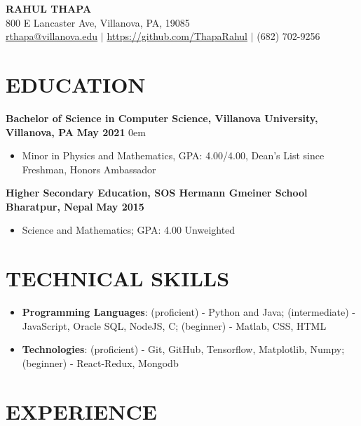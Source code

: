 \documentclass[letterpaper,11pt]{article}
\begin{document}
\begin{center}
    {\LARGE \textbf{RAHUL THAPA}}\\
800 E Lancaster Ave, Villanova, PA, 19085\\
  \href{mailto:rthapa@villanova.edu}{rthapa@villanova.edu} $\vert$ \href{https://github.com/ThapaRahul}{https://github.com/ThapaRahul} $\vert$ (682) 702-9256 \\
\end{center} 



\section{\textbf{EDUCATION}}
      \textbf{Bachelor of Science in Computer Science, Villanova University, Villanova, PA}
      \null\hfill {\textbf{May 2021}}
      \itemsep0em
      \begin{itemize}
      \itemsep0em
          \item \normalfont Minor in Physics and Mathematics, GPA: 4.00/4.00, Dean's List since Freshman, Honors Ambassador
      \end{itemize}
      {\textbf{Higher Secondary Education, SOS Hermann Gmeiner School Bharatpur, Nepal}}
      \null\hfill {\textbf{May 2015}}
      \begin{itemize}
      \itemsep0em
          \item {\normalfont Science and Mathematics;  GPA: 4.00 Unweighted}
      \end{itemize}
  
\section{\textbf{TECHNICAL SKILLS}}
    \begin{itemize}
    \itemsep0em
        \item 
            {\textbf{Programming Languages}: (proficient) - Python and Java; (intermediate) - JavaScript, Oracle SQL, NodeJS, C; (beginner) - Matlab, CSS, HTML}
        \item
            {\textbf{Technologies}: (proficient) - Git, GitHub, Tensorflow, Matplotlib, Numpy; (beginner) -  React-Redux, Mongodb}
    \end{itemize}


  
\section{\textbf{EXPERIENCE}}
            
\end{document}
